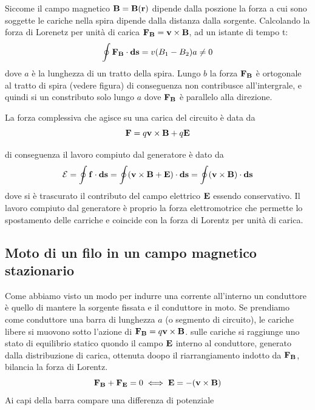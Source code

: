 Siccome il campo magnetico $\bold{B} = \bold{B}(\bold{r})$ dipende dalla poszione la forza a cui sono soggette le cariche nella spira dipende dalla distanza dalla sorgente. Calcolando la forza di Lorenetz  per unit\`a di carica  $\bold{F_B} = \bold{v} \times \bold{B}$, ad un istante di tempo t:
\begin{equation*}
	\oint \bold{F_B} \cdot \bold{ds} = v(B_1 - B_2)a \neq 0 
\end{equation*}
dove $a$ \`e la lunghezza di un tratto della spira.  Lungo $b$ la forza $\bold{F_B}$ \`e ortogonale al tratto di spira (vedere figura) di conseguenza non contribusce all'intergrale, e quindi si un constributo solo lungo $a$ dove $\bold{F_B}$ \`e parallelo alla direzione.

La forza complessiva che agisce su una carica  del circuito \`e data da 
\begin{equation*}
	\bold{F} = q \bold{v} \times \bold{B} + q\bold{E}
\end{equation*}

di conseguenza il lavoro compiuto dal generatore \`e dato da 
\begin{equation*}
	\mathcal{E} = \oint \bold{f} \cdot \bold{ds} = \oint (\bold{v} \times \bold{B} + \bold{E}) \cdot \bold{ds} = \oint (\bold{v} \times \bold{B}) \cdot \bold{ds}
\end{equation*}
dove si \`e trascurato il contributo del campo elettrico $\bold{E}$ essendo conservativo. Il lavoro compiuto dal generatore \`e  proprio la forza elettromotrice che permette lo spostamento delle carriche e coincide con la forza di Lorentz per unit\`a di carica.

\subsection{Moto di un filo in un campo magnetico stazionario}

Come abbiamo visto un modo per indurre una corrente all'interno un conduttore \`e  quello di mantere la sorgente fissata e il conduttore in moto. Se prendiamo come conduttore una barra di lunghezza $a$ (o segmento di circuito), le cariche libere si muovono sotto l'azione di $\bold{F_B} = q \bold{v} \times \bold{B}$.
sulle cariche si raggiunge uno stato di equilibrio statico quondo il campo $\bold{E}$ interno al conduttore, generato dalla distribuzione di carica, ottenuta doopo il riarrangiamento indotto da $\bold{F_B}$, bilancia la forza di Lorentz.
\begin{equation*}
	\bold{F_B} + \bold{F_E} = 0 \iff \bold{E} = - (\bold{v} \times \bold{B})
\end{equation*}  
Ai capi della barra compare una differenza di potenziale

